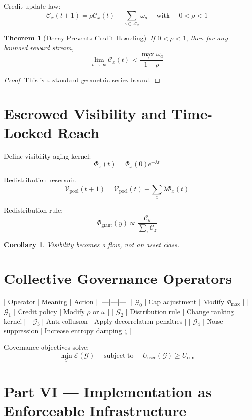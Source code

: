 \documentclass[11pt,a4paper]{article}
\theoremstyle{plain}
\newtheorem{theorem}{Theorem}[section]
\newtheorem{corollary}{Corollary}[section]
\theoremstyle{definition}
\theoremstyle{remark}
\begin{document}
Credit update law:
\[
\mathcal{C}_x(t+1) = \rho \mathcal{C}_x(t) + \sum_{a \in \mathcal{A}_x} \omega_a
\quad \text{ with }\quad 0 < \rho < 1
\]

\begin{theorem}[Decay Prevents Credit Hoarding]
If $0<\rho<1$, then for any bounded reward stream,
\[
\lim_{t \to \infty} \mathcal{C}_x(t) < \frac{\max_a \omega_a}{1-\rho}
\]
\end{theorem}

\begin{proof}
This is a standard geometric series bound.
\end{proof}

\section{Escrowed Visibility and Time-Locked Reach}
Define visibility aging kernel:
\[
\Phi_x(t) = \Phi_x(0) e^{-\lambda t}
\]

Redistribution reservoir:
\[
\mathcal{V}_{\text{pool}}(t+1) = \mathcal{V}_{\text{pool}}(t) + \sum_x \lambda \Phi_x(t)
\]

Redistribution rule:
\[
\Phi_{\text{grant}}(y) \propto \frac{\mathcal{C}_y}{\sum_z \mathcal{C}_z}
\]

\begin{corollary}
Visibility becomes a flow, not an asset class.
\end{corollary}

\section{Collective Governance Operators}

| Operator | Meaning | Action |
|---|---|---|
| $\mathcal{G}_0$ | Cap adjustment | Modify $\Phi_{\max}$ |
| $\mathcal{G}_1$ | Credit policy | Modify $\rho$ or $\omega$ |
| $\mathcal{G}_2$ | Distribution rule | Change ranking kernel |
| $\mathcal{G}_3$ | Anti-collusion | Apply decorrelation penalties |
| $\mathcal{G}_4$ | Noise suppression | Increase entropy damping $\zeta$ |

Governance objectives solve:
\[
\min_{\mathcal{G}} \mathcal{E}(\mathcal{G}) \quad \text{ subject to } \quad U_{\text{user}}(\mathcal{G}) \ge U_{\min}
\]

\newpage

\section*{Part VI — Implementation as Enforceable Infrastructure}
\end{document}
